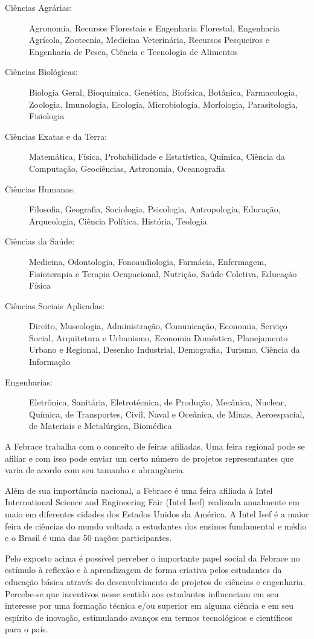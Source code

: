 \begin{description}
    \item[Ciências Agrárias:] 
        Agronomia, Recursos Florestais e Engenharia Florestal, Engenharia Agrícola, Zootecnia, Medicina Veterinária, Recursos Pesqueiros e Engenharia de Pesca, Ciência e Tecnologia de Alimentos
    \item[Ciências Biológicas:] 
        Biologia Geral, Bioquímica, Genética, Biofísica, Botânica, Farmacologia, Zoologia, Imunologia, Ecologia, Microbiologia, Morfologia, Parasitologia, Fisiologia 	 
    \item[Ciências Exatas e da Terra:] 
        Matemática, Física, Probabilidade e Estatística, Química, Ciência da Computação, Geociências, Astronomia, Oceanografia 
    \item[Ciências Humanas:] 
        Filosofia, Geografia, Sociologia, Psicologia, Antropologia, Educação, Arqueologia, Ciência Política, História, Teologia 
    \item[Ciências da Saúde:] 
        Medicina, Odontologia, Fonoaudiologia, Farmácia, Enfermagem, Fisioterapia e Terapia Ocupacional, Nutrição, Saúde Coletiva, Educação Física
    \item[Ciências Sociais Aplicadas:] 
        Direito, Museologia, Administração, Comunicação, Economia, Serviço Social, Arquitetura e Urbanismo, Economia Doméstica, Planejamento Urbano e Regional, Desenho Industrial, Demografia, Turismo, Ciência da Informação  	 
    \item[Engenharias:] 
        Eletrônica, Sanitária, Eletrotécnica, de Produção, Mecânica, Nuclear, Química, de Transportes, Civil, Naval e Oceânica, de Minas, Aeroespacial, de Materiais e Metalúrgica, Biomédica 
\end{description}

A Febrace trabalha com o conceito de feiras afiliadas. Uma feira regional pode se afiliar e com isso pode enviar um certo número de projetos representantes que varia de acordo com seu tamanho e abrangência.

Além de sua importância nacional, a Febrace é uma feira afiliada à Intel International Science and Engineering Fair (Intel Isef) realizada anualmente em maio em diferentes cidades dos Estados Unidos da América. A Intel Isef é a maior feira de ciências do mundo voltada a estudantes dos ensinos fundamental e médio e o Brasil é uma das 50 nações participantes.

Pelo exposto acima é possível perceber o importante papel social da Febrace no estímulo à reflexão e à aprendizagem de forma criativa pelos estudantes da educação básica através do desenvolvimento de projetos de ciências e engenharia. Percebe-se que incentivos nesse sentido aos estudantes influenciam em seu interesse por uma formação técnica e/ou superior em alguma ciência e em seu espírito de inovação, estimulando avanços em termos tecnológicos e científicos para o país.

